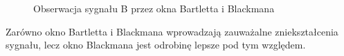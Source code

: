 \documentclass[12pt,titlepage]{report}
\begin{document}
\begin{figure}[!h]
	\centering
	\caption{Obserwacja sygnału B przez okna Bartletta i Blackmana}
\end{figure}

Zarówno okno Bartletta i Blackmana wprowadzają zauważalne zniekształcenia sygnału, lecz okno Blackmana jest odrobinę lepsze pod tym względem.
\newpage
\end{document}
